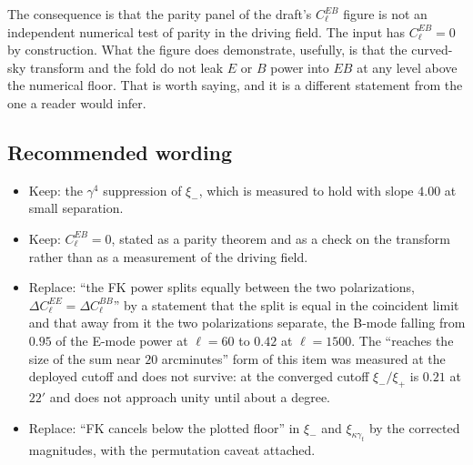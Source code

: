 The consequence is that the parity panel of the draft's
$C_\ell^{EB}$ figure is not an independent numerical test of parity in the
driving field. The input has $C_\ell^{EB}=0$ by construction. What the
figure does demonstrate, usefully, is that the curved-sky transform and the
fold do not leak $E$ or $B$ power into $EB$ at any level above the
numerical floor. That is worth saying, and it is a different statement from
the one a reader would infer.

\subsection{Recommended wording}

\begin{itemize}
\item Keep: the $\gamma^4$ suppression of $\xi_-$, which is measured to
hold with slope $4.00$ at small separation.
\item Keep: $C_\ell^{EB}=0$, stated as a parity theorem and as a check on
the transform rather than as a measurement of the driving field.
\item Replace: ``the FK power splits equally between the two
polarizations, $\Delta C_\ell^{EE}=\Delta C_\ell^{BB}$'' by a statement
that the split is equal in the coincident limit and that away from it the
two polarizations separate, the B-mode falling from $0.95$ of the E-mode
power at $\ell=60$ to $0.42$ at $\ell=1500$. The ``reaches the size of the
sum near $20$ arcminutes'' form of this item was measured at the deployed
cutoff and does not survive: at the converged cutoff $\xi_-/\xi_+$ is
$0.21$ at $22'$ and does not approach unity until about a degree.
\item Replace: ``FK cancels below the plotted floor'' in $\xi_-$ and
$\xi_{\kappa\gamma_t}$ by the corrected magnitudes, with the permutation
caveat attached.
\end{itemize}
